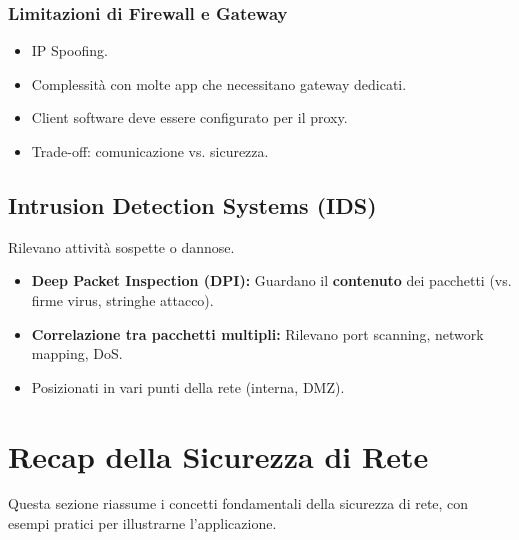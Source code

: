 \subsubsection{Limitazioni di Firewall e Gateway}
\begin{itemize}
    \item IP Spoofing.
    \item Complessità con molte app che necessitano gateway dedicati.
    \item Client software deve essere configurato per il proxy.
    \item Trade-off: comunicazione vs. sicurezza.
\end{itemize}

\subsection{Intrusion Detection Systems (IDS)}
Rilevano attività sospette o dannose.
\begin{itemize}
    \item \textbf{Deep Packet Inspection (DPI):} Guardano il \textbf{contenuto} dei pacchetti (vs. firme virus, stringhe attacco).
    \item \textbf{Correlazione tra pacchetti multipli:} Rilevano port scanning, network mapping, DoS.
    \item Posizionati in vari punti della rete (interna, DMZ).
\end{itemize}

\section{Recap della Sicurezza di Rete}
\label{sec:recap_sicurezza}

Questa sezione riassume i concetti fondamentali della sicurezza di rete, con esempi pratici per illustrarne l'applicazione.

